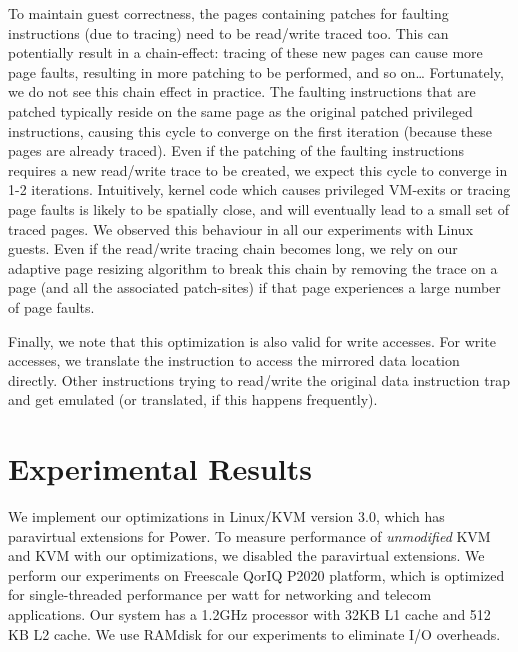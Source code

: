 \documentclass[10pt,twocolumn]{article}
\begin{document}
To maintain guest correctness, the pages containing patches for
faulting instructions (due to tracing) need to be read/write traced too.
This can potentially result in a chain-effect: tracing of these new pages
can cause more page faults, resulting in more patching to be performed, and so on\ldots
Fortunately, we do not see this chain effect in practice. The faulting instructions
that are patched typically reside on the same
page as the original patched privileged instructions, causing this
cycle to converge on the first iteration (because these pages are already traced).
Even if the patching of the faulting instructions requires a new read/write trace to be
created, we expect this
cycle to converge in 1-2 iterations. Intuitively, kernel
code which causes privileged
VM-exits or tracing page faults is likely to be spatially close, and will eventually
lead to a small set of traced pages. We observed this behaviour in all our experiments
with Linux guests. Even if the read/write tracing chain becomes long, we rely on
our adaptive page resizing algorithm to break this chain by removing the
trace on a page (and all the associated patch-sites)
if that page experiences a large number of page faults.

Finally, we note that this optimization is also valid for write accesses. For write
accesses, we translate the instruction to access the mirrored data location
directly. Other instructions trying to read/write the original data instruction
trap and get emulated (or translated, if this happens frequently).
\section{Experimental Results}
\label{sec:results}
We implement our optimizations in Linux/KVM version 3.0, which
has paravirtual extensions for Power. To measure performance of
{\em unmodified} KVM and KVM with our optimizations,
we disabled the paravirtual extensions. We perform our experiments
on Freescale QorIQ P2020 platform, which is optimized for single-threaded
performance per watt for networking and telecom applications. Our
system has a 1.2GHz processor with 32KB L1 cache and 512 KB L2 cache.
We use RAMdisk for our experiments to eliminate I/O
overheads.
\end{document}
